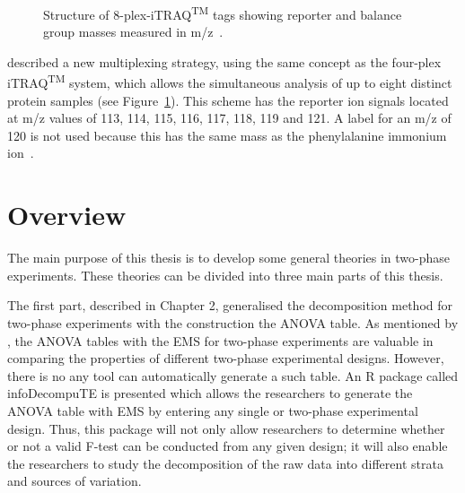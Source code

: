 \documentclass[11pt,a4paper]{article}
\begin{document}
\begin{figure}[htb]
\caption{Structure of 8-plex-iTRAQ\textsuperscript{TM} tags showing reporter and balance group masses measured in m/z~\citep{Choe2007}.}
\label{fig:8-plex}
\end{figure}

\cite{Choe2007} described a new multiplexing strategy, using the same concept as the four-plex iTRAQ\textsuperscript{TM} system, which allows the simultaneous analysis of up to eight distinct protein samples (see Figure~\ref{fig:8-plex}). This scheme has the reporter ion signals located at m/z values of 113, 114, 115, 116, 117, 118, 119 and 121. A label for an m/z of 120 is not used because this has the same mass as the phenylalanine immonium ion~\citep{Pierce2008}.   

\section{Overview}
\label{sec:overview}
The main purpose of this thesis is to develop some general theories in two-phase experiments. These theories can be divided into three main parts of this thesis. 

The first part, described in Chapter 2,  generalised the decomposition method for two-phase experiments with the construction the ANOVA table. As mentioned by \cite{Brien2011}, the ANOVA tables with the EMS for two-phase experiments are valuable in comparing the properties of different two-phase experimental designs. However, there is no any tool can automatically generate a such table. An R package called infoDecompuTE is presented which allows the researchers to generate the ANOVA table with EMS by entering any single or two-phase experimental design. Thus, this package will not only allow researchers to determine whether or not a valid F-test can be conducted from any given design; it will also enable the researchers to study the decomposition of the raw data into different strata and sources of variation.
\end{document}

